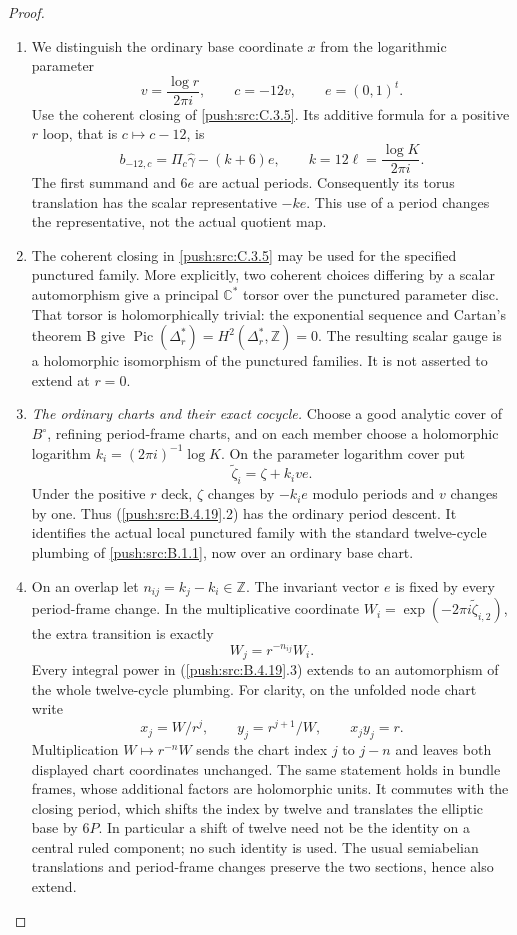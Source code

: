 \begin{proof}
\begin{enumerate}[label=\arabic*.,leftmargin=*]
\item We distinguish the ordinary base coordinate $x$ from
the logarithmic parameter
\[
 v=\frac{\log r}{2\pi i},\qquad c=-12v,
 \qquad e=(0,1)^t.
\]
Use the coherent closing of \ref{push:src:C.3.5}. Its additive formula
for a positive $r$ loop, that is $c\mapsto c-12$, is
\[
 b_{-12,c}=\Pi_c\widehat\gamma-(k+6)e,
 \qquad k=12\ell=\frac{\log K}{2\pi i}.
 \tag{B.4.19.1}
\]
The first summand and $6e$ are actual periods.
Consequently its torus translation has the scalar
representative $-ke$. This use of a period changes
the representative, not the actual quotient map.

\item The coherent closing in \ref{push:src:C.3.5} may be used for the
specified punctured family. More explicitly, two
coherent choices differing by a scalar automorphism
give a principal $\mathbb C^*$ torsor over the punctured
parameter disc. That torsor is holomorphically trivial:
the exponential sequence and Cartan's theorem B give
$\operatorname{Pic}(\Delta_r^*)=H^2(\Delta_r^*,\mathbb Z)=0$.
The resulting scalar gauge is a holomorphic
isomorphism of the punctured families. It is not
asserted to extend at $r=0$.

\item \emph{The ordinary charts and their exact cocycle.}
Choose a good analytic cover of $B^\circ$, refining
period-frame charts, and on each member choose a
holomorphic logarithm $k_i=(2\pi i)^{-1}\log K$.
On the parameter logarithm cover put
\[
 \widetilde\zeta_i=\zeta+k_i v e.
 \tag{B.4.19.2}
\]
Under the positive $r$ deck, $\zeta$ changes by
$-k_i e$ modulo periods and $v$ changes by one.
Thus (\ref{push:src:B.4.19}.2) has the ordinary period descent.
It identifies the actual local punctured family
with the standard twelve-cycle plumbing of \ref{push:src:B.1.1},
now over an ordinary base chart.

\item On an overlap let $n_{ij}=k_j-k_i\in\mathbb Z$.
The invariant vector $e$ is fixed by every period-frame
change. In the multiplicative coordinate
$W_i=\exp(-2\pi i\widetilde\zeta_{i,2})$, the extra
transition is exactly
\[
 W_j=r^{-n_{ij}}W_i.
 \tag{B.4.19.3}
\]
Every integral power in (\ref{push:src:B.4.19}.3) extends to an
automorphism of the whole twelve-cycle plumbing.
For clarity, on the unfolded node chart write
\[
 x_j=W/r^j,\qquad y_j=r^{j+1}/W,
 \qquad x_jy_j=r.
\]
Multiplication $W\mapsto r^{-n}W$ sends the chart
index $j$ to $j-n$ and leaves both displayed chart
coordinates unchanged. The same statement holds
in bundle frames, whose additional factors are
holomorphic units. It commutes with the closing
period, which shifts the index by twelve and
translates the elliptic base by $6P$. In particular
a shift of twelve need not be the identity on a
central ruled component; no such identity is used.
The usual semiabelian translations and period-frame
changes preserve the two sections, hence also extend.


\end{enumerate}
\end{proof}
